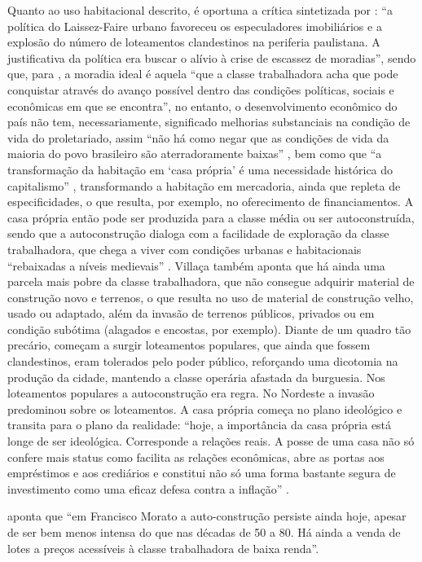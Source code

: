 	Quanto ao uso habitacional descrito, é oportuna a crítica sintetizada por : ``a política do Laissez-Faire urbano favoreceu os especuladores imobiliários e a explosão do número de loteamentos clandestinos na periferia paulistana. A justificativa da política era buscar o alívio à crise de escassez de moradias'', sendo que, para , a moradia ideal é aquela ``que a classe trabalhadora acha que pode conquistar através do avanço possível dentro das condições políticas, sociais e econômicas em que se encontra'', no entanto, o desenvolvimento econômico do país não tem, necessariamente, significado melhorias substanciais na condição de vida do proletariado, assim ``não há como negar que as condições de vida da maioria do povo brasileiro são aterradoramente baixas'' \cite[p.14]{villaca1986a}, bem como que ``a transformação da habitação em `casa própria' é uma necessidade histórica do capitalismo'' \cite[p.19]{villaca1986a}, transformando a habitação em mercadoria, ainda que repleta de especificidades, o que resulta, por exemplo, no oferecimento de financiamentos. A casa própria então pode ser produzida para a classe média ou ser autoconstruída, sendo que a autoconstrução dialoga com a facilidade de exploração da classe trabalhadora, que chega a viver com condições urbanas e habitacionais ``rebaixadas a níveis medievais'' \cite[p.21]{villaca1986a}. Villaça também aponta que há ainda uma parcela mais pobre da classe trabalhadora, que não consegue adquirir material de construção novo e terrenos, o que resulta no uso de material de construção velho, usado ou adaptado, além da invasão de terrenos públicos, privados ou em condição subótima (alagados e encostas, por exemplo). Diante de um quadro tão precário, começam a surgir loteamentos populares, que ainda que fossem clandestinos, eram tolerados pelo poder público, reforçando uma dicotomia na produção da cidade, mantendo a classe operária afastada da burguesia. Nos loteamentos populares a autoconstrução era regra. No Nordeste a invasão predominou sobre os loteamentos. A casa própria começa no plano ideológico e transita para o plano da realidade: ``hoje, a importância da casa própria está longe de ser ideológica. Corresponde a relações reais. A posse de uma casa não só confere mais status como facilita as relações econômicas, abre as portas aos empréstimos e aos crediários e constitui não só uma forma bastante segura de investimento como uma eficaz defesa contra a inflação'' \cite[p.24]{villaca1986a}.
	
	 aponta que ``em Francisco Morato a auto-construção persiste ainda hoje, apesar de ser bem menos intensa do que nas décadas de 50 a 80. Há ainda a venda de lotes a preços acessíveis à classe trabalhadora de baixa renda''.
	
